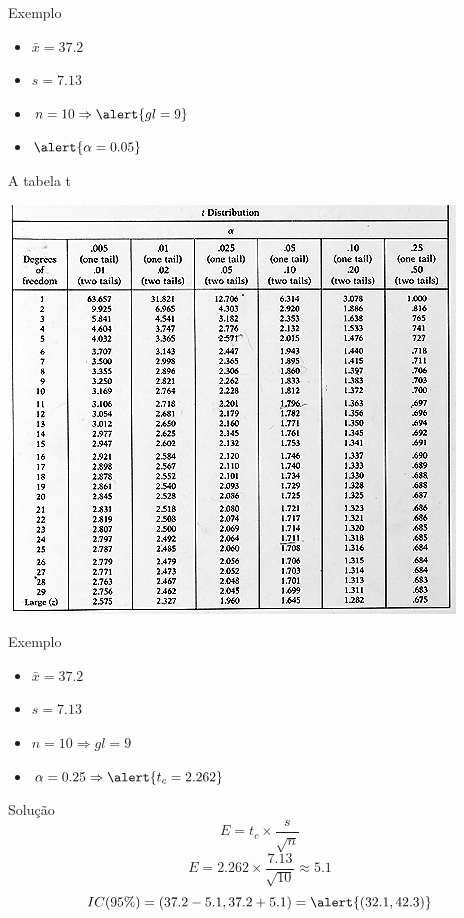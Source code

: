\documentclass{beamer}
\begin{document}
\begin{frame}{Exemplo}
  \begin{example}
    \begin{itemize}
    \item $\bar{x}=37.2$
    \item $s=7.13$
    \item $n=10 \Rightarrow \alert{gl=9}$
    \item $\alert{\alpha = 0.05}$
    \end{itemize}
  \end{example}
\end{frame}

\begin{frame}{A tabela t}
  \begin{center}
    \includegraphics[height=0.9\textheight]{Inf_II/t_table}
  \end{center}
\end{frame}

\begin{frame}{Exemplo}
  \begin{example}
    \begin{itemize}
    \item<1-> $\bar{x}=37.2$
    \item<1-> $s=7.13$
    \item<1-> $n=10 \Rightarrow gl=9$
    \item $\alpha = 0.25 \Rightarrow \alert{t_c = 2.262}$
    \end{itemize}
  \end{example}
  \begin{block}{Solução}
    \begin{displaymath}
      E = t_c \times \frac{s}{\sqrt{n}}
    \end{displaymath}
    \begin{displaymath}
      E = 2.262 \times \frac{7.13}{\sqrt{10}} \approx 5.1
    \end{displaymath}
    \begin{displaymath}
      IC(95\%) = (37.2 - 5.1 , 37.2 + 5.1 ) = \alert{(32.1 , 42.3)}
    \end{displaymath}
  \end{block}
\end{frame}
\end{document}
